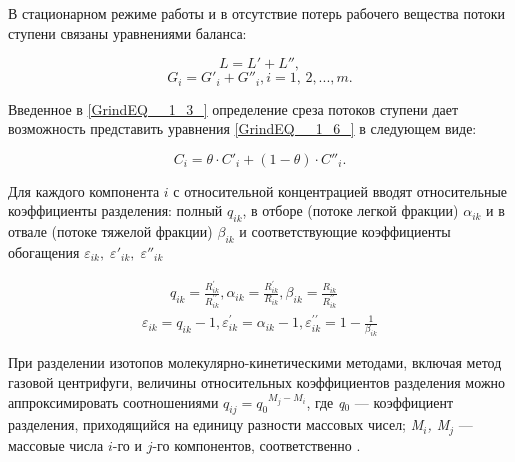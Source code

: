 В стационарном режиме работы и в отсутствие потерь рабочего вещества потоки ступени связаны уравнениями баланса:

\begin{equation} \label{GrindEQ__1_5_} 
  L=L'+L'', 
  \end{equation} 
  \begin{equation} \label{GrindEQ__1_6_} 
  G_{i} =G'_{i} + G''_{i} , i=1,\, 2,...,m.             
\end{equation} 
  
Введенное в \ref{GrindEQ__1_3_} определение среза потоков ступени дает возможность представить уравнения \ref{GrindEQ__1_6_} в следующем виде:

\begin{equation} \label{GrindEQ__1_7_} 
  C_{i} =\theta  \cdot C'_{i} +(1-\theta ) \cdot C''_{i} . 
\end{equation} 

Для каждого компонента $i$ с относительной концентрацией вводят относительные коэффициенты разделения: полный $q_{ik}$, в отборе (потоке легкой фракции) $\alpha _{ik} $ и в отвале (потоке тяжелой фракции) $\beta _{ik} $ и соответствующие коэффициенты обогащения $\varepsilon _{ik} ,\; \varepsilon '_{ik} ,\; \varepsilon ''_{ik} \; $

\begin{equation} \label{GrindEQ__1_11_} 
  \begin{array}{l}
    \qquad q_{i k}=\frac{R_{i k}^{\prime}}{R_{i k}^{\prime \prime}}, \alpha_{i k}=\frac{R_{i k}^{\prime}}{R_{i k}}, \beta_{i k}=\frac{R_{i k}}{R_{i k}^{\prime \prime}} \\
    \varepsilon_{i k}=q_{i k}-1, \varepsilon_{i k}^{\prime}=\alpha_{i k}-1, \varepsilon_{i k}^{\prime \prime}=1-\frac{1}{\beta_{i k}}
    \end{array}
\end{equation} 

При разделении изотопов молекулярно-кинетическими методами, включая метод газовой центрифуги, величины относительных коэффициентов разделения можно аппроксимировать соотношениями $q_{ij} =q_{0} {}^{M_{j} -M_{i} }$, где \textit{q}${}_{0}$ --- коэффициент разделения, приходящийся на единицу разности массовых чисел; \textit{M${}_{i}$, M${}_{j}$} --- массовые числа $i$-го и $j$-го компонентов, соответственно \cite{sulaberidzeTeoriyaKaskadovDlya2011}.

